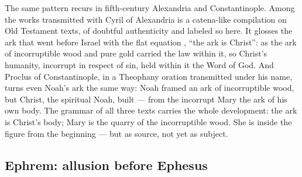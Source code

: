 The same pattern recurs in fifth-century Alexandria and
Constantinople. Among the works transmitted with Cyril of Alexandria
is a catena-like compilation on Old Testament texts, of doubtful
authenticity and labeled so here. It glosses the ark that went before
Israel with the flat equation ,
``the ark is Christ'': as the ark of incorruptible wood and pure gold
carried the law within it, so Christ's humanity, incorrupt in respect
of sin, held within it the Word of God. And Proclus of Constantinople,
in a Theophany oration transmitted under his name, turns even Noah's
ark the same way: Noah framed an ark of incorruptible wood, but
Christ, the spiritual Noah, built  --- from the incorrupt Mary the ark of his own
body. The grammar of all three texts carries the whole
development: the ark is Christ's body; Mary is the quarry of the
incorruptible wood. She is inside the figure from the beginning ---
but as source, not yet as subject.

\subsection{Ephrem: allusion before Ephesus}

